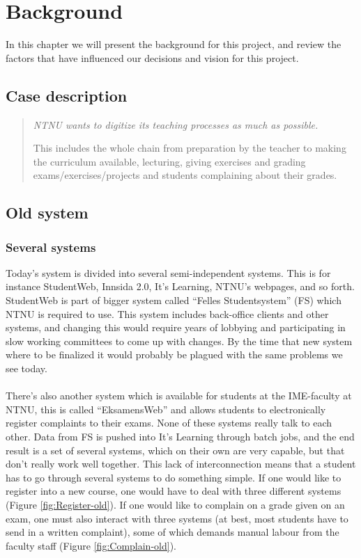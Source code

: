 \section{Background}
In this chapter we will present the background for this project, and review the factors that have
influenced our decisions and vision for this project.

\subsection{Case description}

\begin{quotation}
  \em NTNU wants to digitize its teaching processes as much as possible.\newline

   This includes the whole chain from preparation by the teacher to making the curriculum available, lecturing, giving exercises and grading exams/exercises/projects and students complaining about their grades.
\end{quotation}

\subsection{Old system}
\subsubsection{Several systems}
Today's system is divided into several semi-independent systems. This is for instance StudentWeb, Innsida 2.0, It's Learning, NTNU's webpages, and so forth. 
StudentWeb is part of bigger system called ``Felles Studentsystem'' (FS) which NTNU is required to use. This system includes back-office clients and other systems, and changing this
would require years of lobbying and participating in slow working committees to come up with changes. By the time that new system where to be finalized it would probably be plagued with the same problems we see today.
~\\\\
 There's also another system which is available for students at the IME-faculty at NTNU, this is called ``EksamensWeb'' and allows students to electronically register complaints to 
 their exams. None of these systems really talk to each other. Data from FS is pushed into It's Learning through batch jobs, and the end result is a set of several systems, which on their own are very capable, but that don't really work well together.  
 This lack of interconnection means that a student has to go through several systems to do something simple. If one would like to register into a new course, one would have to deal with three different systems (Figure \ref{fig:Register-old}). If one would like to complain on a grade given on an exam, one must also interact with three systems (at best, most students have to send in a written complaint), some of which demands manual labour from the faculty staff (Figure \ref{fig:Complain-old}).

